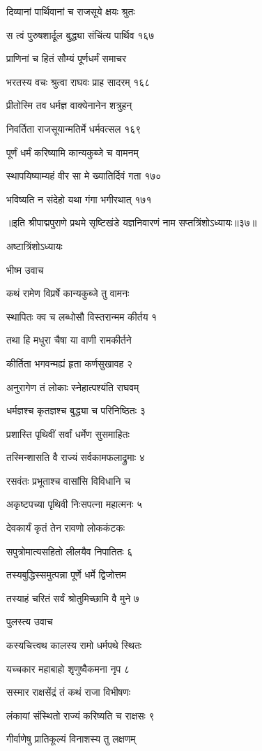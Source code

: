 दिव्यानां पार्थिवानां च राजसूये क्षयः श्रुतः

स त्वं पुरुषशार्दूल बुद्ध्या संचिंत्य पार्थिव १६७

प्राणिनां च हितं सौम्यं पूर्णधर्मं समाचर

भरतस्य वचः श्रुत्वा राघवः प्राह सादरम् १६८

प्रीतोस्मि तव धर्मज्ञ वाक्येनानेन शत्रुहन्

निवर्तिता राजसूयान्मतिर्मे धर्मवत्सल १६९

पूर्णं धर्मं करिष्यामि कान्यकुब्जे च वामनम्

स्थापयिष्याम्यहं वीर सा मे ख्यातिर्दिवं गता १७०

भविष्यति न संदेहो यथा गंगा भगीरथात् १७१ 

॥इति श्रीपाद्मपुराणे प्रथमे सृष्टिखंडे यज्ञनिवारणं नाम सप्तत्रिंशोऽध्यायः॥३७॥

अष्टात्रिंशोऽध्यायः

भीष्म उवाच

कथं रामेण विप्रर्षे कान्यकुब्जे तु वामनः

स्थापितः क्व च लब्धोसौ विस्तरान्मम कीर्तय १

तथा हि मधुरा चैषा या वाणी रामकीर्तने

कीर्तिता भगवन्मह्यं हृता कर्णसुखावह २

अनुरागेण तं लोकाः स्नेहात्पश्यंति राघवम्

धर्मज्ञश्च कृतज्ञश्च बुद्ध्या च परिनिष्ठितः ३

प्रशास्ति पृथिवीं सर्वां धर्मेण सुसमाहितः

तस्मिन्शासति वै राज्यं सर्वकामफलाद्रुमाः ४

रसवंतः प्रभूताश्च वासांसि विविधानि च

अकृष्टपच्या पृथिवी निःसपत्ना महात्मनः ५

देवकार्यं कृतं तेन रावणो लोककंटकः

सपुत्रोमात्यसहितो लीलयैव निपातितः ६

तस्यबुद्धिस्समुत्पन्ना पूर्णे धर्मे द्विजोत्तम

तस्याहं चरितं सर्वं श्रोतुमिच्छामि वै मुने ७

पुलस्त्य उवाच

कस्यचित्त्वथ कालस्य रामो धर्मपथे स्थितः

यच्चकार महाबाहो शृणुष्वैकमना नृप ८

सस्मार राक्षसेंद्रं तं कथं राजा विभीषणः

लंकायां संस्थितो राज्यं करिष्यति च राक्षसः ९

गीर्वाणेषु प्रातिकूल्यं विनाशस्य तु लक्षणम्

